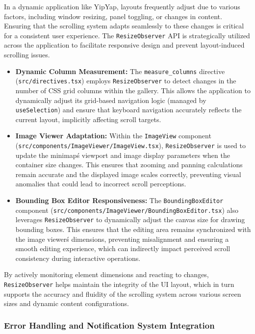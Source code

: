 \documentclass[10pt]{article}
\begin{document}
In a dynamic application like YipYap, layouts frequently adjust due to various factors, including window resizing, panel toggling, or changes in content. Ensuring that the scrolling system adapts seamlessly to these changes is critical for a consistent user experience. The \texttt{ResizeObserver} API is strategically utilized across the application to facilitate responsive design and prevent layout-induced scrolling issues.
\begin{itemize}
    \item \textbf{Dynamic Column Measurement:} The \texttt{measure\_columns} directive (\texttt{src/directives.tsx}) employs \texttt{ResizeObserver} to detect changes in the number of CSS grid columns within the gallery. This allows the application to dynamically adjust its grid-based navigation logic (managed by \texttt{useSelection}) and ensure that keyboard navigation accurately reflects the current layout, implicitly affecting scroll targets.
    \item \textbf{Image Viewer Adaptation:} Within the \texttt{ImageView} component (\texttt{src/components/ImageViewer/ImageView.tsx}), \texttt{ResizeObserver} is used to update the minimap\'s viewport and image display parameters when the container size changes. This ensures that zooming and panning calculations remain accurate and the displayed image scales correctly, preventing visual anomalies that could lead to incorrect scroll perceptions.
    \item \textbf{Bounding Box Editor Responsiveness:} The \texttt{BoundingBoxEditor} component (\texttt{src/components/ImageViewer/BoundingBoxEditor.tsx}) also leverages \texttt{ResizeObserver} to dynamically adjust the canvas size for drawing bounding boxes. This ensures that the editing area remains synchronized with the image viewer\'s dimensions, preventing misalignment and ensuring a smooth editing experience, which can indirectly impact perceived scroll consistency during interactive operations.
\end{itemize}
By actively monitoring element dimensions and reacting to changes, \texttt{ResizeObserver} helps maintain the integrity of the UI layout, which in turn supports the accuracy and fluidity of the scrolling system across various screen sizes and dynamic content configurations.

\subsubsection{Error Handling and Notification System Integration}
\end{document}
